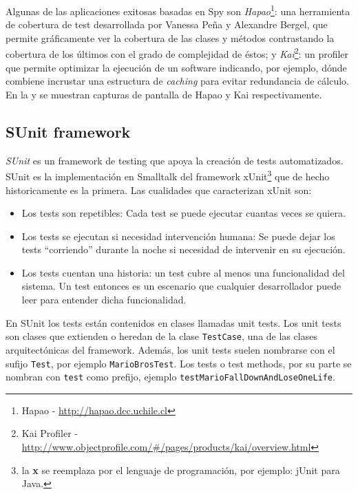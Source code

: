 \par Algunas de las aplicaciones exitosas basadas en Spy son \emph{Hapao}\footnote{Hapao - \url{http://hapao.dcc.uchile.cl}}: una herramienta de cobertura de test desarrollada por Vanessa Peña y Alexandre Bergel, que permite gráficamente ver la cobertura de las clases y métodos contrastando la cobertura de los últimos con el grado de complejidad de éstos; y \emph{Kai}\footnote{Kai Profiler - \url{http://www.objectprofile.com/\#/pages/products/kai/overview.html}}: un profiler que permite optimizar la ejecución de un software indicando, por ejemplo, dónde combiene incrustar una estructura de \emph{caching} para evitar redundancia de cálculo. En la  y  se muestran capturas de pantalla de Hapao y Kai respectivamente.


\clearpage
\subsection{SUnit framework}
\par \emph{SUnit} es un framework de testing que apoya la creación de tests automatizados. SUnit es la implementación en Smalltalk del framework xUnit\footnote{la \textbf{x} se reemplaza por el lenguaje de programación, por ejemplo: jUnit para Java.} que de hecho historicamente es la primera. Las cualidades que caracterizan xUnit son:

\begin{itemize}
\item Los tests son repetibles: Cada test se puede ejecutar cuantas veces se quiera.
\item Los tests se ejecutan si necesidad intervención humana: Se puede dejar los tests ``corriendo'' durante la noche si necesidad de intervenir en su ejecución.
\item Los tests cuentan una historia: un test cubre al menos una funcionalidad del sistema. Un test entonces es un escenario que cualquier desarrollador puede leer para entender dicha funcionalidad.
\end{itemize}

\par En SUnit los tests están contenidos en clases llamadas unit tests. Los unit tests son clases que extienden o heredan de la clase {\tt TestCase}, una de las clases arquitectónicas del framework. Además, los unit tests suelen nombrarse con el sufijo {\tt Test}, por ejemplo {\tt MarioBrosTest}. Los tests o test methods, por su parte se nombran con {\tt test} como prefijo, ejemplo {\tt testMarioFallDownAndLoseOneLife}.


